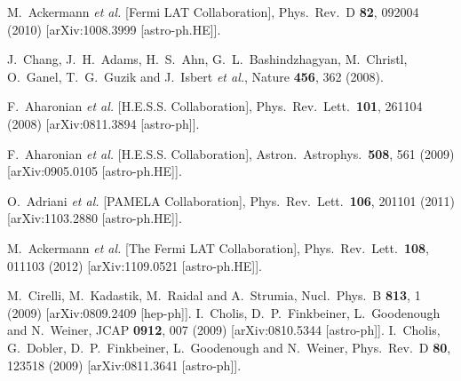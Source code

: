   M.~Ackermann {\it et al.}  [Fermi LAT Collaboration],
  Phys.\ Rev.\ D {\bf 82}, 092004 (2010)
  [arXiv:1008.3999 [astro-ph.HE]].

  J.~Chang, J.~H.~Adams, H.~S.~Ahn, G.~L.~Bashindzhagyan, M.~Christl, O.~Ganel, T.~G.~Guzik and J.~Isbert {\it et al.},
  Nature {\bf 456}, 362 (2008).

  F.~Aharonian {\it et al.}  [H.E.S.S. Collaboration],
  Phys.\ Rev.\ Lett.\  {\bf 101}, 261104 (2008)
  [arXiv:0811.3894 [astro-ph]].

  F.~Aharonian {\it et al.}  [H.E.S.S. Collaboration],
  Astron.\ Astrophys.\  {\bf 508}, 561 (2009)
  [arXiv:0905.0105 [astro-ph.HE]].

  O.~Adriani {\it et al.}  [PAMELA Collaboration],
  Phys.\ Rev.\ Lett.\  {\bf 106}, 201101 (2011)
  [arXiv:1103.2880 [astro-ph.HE]].

  M.~Ackermann {\it et al.}  [The Fermi LAT Collaboration],
  Phys.\ Rev.\ Lett.\  {\bf 108}, 011103 (2012)
  [arXiv:1109.0521 [astro-ph.HE]].

  M.~Cirelli, M.~Kadastik, M.~Raidal and A.~Strumia,
  Nucl.\ Phys.\ B {\bf 813}, 1 (2009)
  [arXiv:0809.2409 [hep-ph]].
  I.~Cholis, D.~P.~Finkbeiner, L.~Goodenough and N.~Weiner,
  JCAP {\bf 0912}, 007 (2009)
  [arXiv:0810.5344 [astro-ph]].
  I.~Cholis, G.~Dobler, D.~P.~Finkbeiner, L.~Goodenough and N.~Weiner,
  Phys.\ Rev.\ D {\bf 80}, 123518 (2009)
  [arXiv:0811.3641 [astro-ph]].

